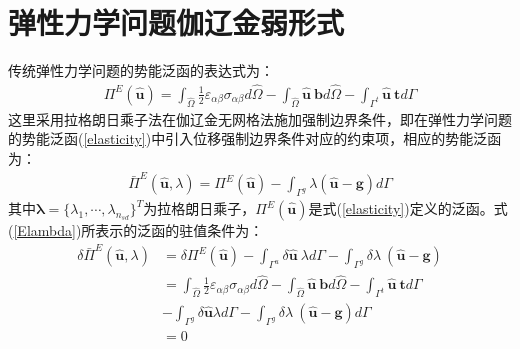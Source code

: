 \section{弹性力学问题伽辽金弱形式}
传统弹性力学问题的势能泛函的表达式为：
\begin{equation}\label{elasticity}
\begin{split}
    \Pi^E(\hat{\pmb{u}})=\int_{\hat{\Omega}}\frac{1}{2}\varepsilon_{\alpha\beta}\sigma_{\alpha\beta}d\hat{\Omega}-\int_{\hat{\Omega}}\hat{\pmb{u}}~\pmb{b}d\hat{\Omega}-\int_{\Gamma^t}\hat{\pmb{u}}~\pmb{t}d\Gamma
\end{split}
\end{equation}
这里采用拉格朗日乘子法在伽辽金无网格法施加强制边界条件，即在弹性力学问题的势能泛函(\ref{elasticity})中引入位移强制边界条件对应的约束项，相应的势能泛函为：
\begin{equation}\label{Elambda}
\begin{split}
    \bar{\Pi}^E(\hat{\pmb{u}},\lambda)=\Pi^E(\hat{\pmb{u}})-\int_{\Gamma^g}\lambda(\hat{\pmb{u}}-\pmb{g})d\Gamma
\end{split}
\end{equation}
其中$\pmb{\lambda}=\{\lambda_1,\dotsb,\lambda_{n_{sd}}\}^T$为拉格朗日乘子，$\Pi^E(\hat{\pmb{u}})$是式(\ref{elasticity})定义的泛函。式(\ref{Elambda})所表示的泛函的驻值条件为：
\begin{equation} 
\begin{split}
    \delta\bar{\Pi}^E(\hat{\pmb{u}},\lambda)&=\delta\Pi^E(\hat{\pmb{u}})-\int_{\Gamma^u}\delta\hat{\pmb{u}}~\lambda d\Gamma-\int_{\Gamma^g}\delta\lambda~(\hat{\pmb{u}}-\pmb{g})\\
    &=\int_{\hat{\Omega}}\frac{1}{2}\varepsilon_{\alpha\beta}\sigma_{\alpha\beta}d\hat{\Omega}-\int_{\hat{\Omega}}\hat{\pmb{u}}~\pmb{b}d\hat{\Omega}-\int_{\Gamma^t}\hat{\pmb{u}}~\pmb{t}d\Gamma\\
    &-\int_{\Gamma^g}\delta\hat{\pmb{u}}\lambda d\Gamma-\int_{\Gamma^g}\delta\lambda~(\hat{\pmb{u}}-\pmb{g})d\Gamma\\
    &=0
\end{split}
\end{equation}
